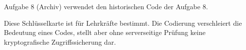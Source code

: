\documentclass[10pt,a4paper]{article}
\begin{document}
\smallskip
\textcolor{Muted}{\small Aufgabe 8 (Archiv) verwendet den historischen Code der Aufgabe 8.}

\vfill
\textcolor{Muted}{\small
Diese Schlüsselkarte ist für Lehrkräfte bestimmt. Die Codierung verschleiert
die Bedeutung eines Codes, stellt aber ohne serverseitige Prüfung keine
kryptografische Zugriffssicherung dar.}
\end{document}
